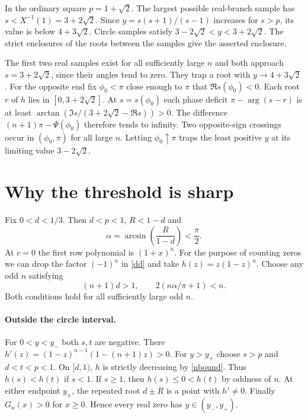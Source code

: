 \documentclass[11pt]{article}
\begin{document}
In the ordinary square $p=1+\sqrt2$. The largest possible real-branch sample has $s<X^{-1}(1)=3+2\sqrt2$. Since $y=s(s+1)/(s-1)$ increases for $s>p$, its value is below $4+3\sqrt2$. Circle samples satisfy $3-2\sqrt2<y<3+2\sqrt2$. The strict enclosures of the roots between the samples give the asserted enclosure.

The first two real samples exist for all sufficiently large $n$ and both approach $s=3+2\sqrt2$, since their angles tend to zero. They trap a root with $y\to4+3\sqrt2$. For the opposite end fix $\phi_0<\pi$ close enough to $\pi$ that $\Re s(\phi_0)<0$. Each root $r$ of $h$ lies in $[0,3+2\sqrt2]$. At $s=s(\phi_0)$ each phase deficit $\pi-\arg(s-r)$ is at least $\arctan(\Im s/(3+2\sqrt2-\Re s))>0$. The difference $(n+1)\pi-\Psi(\phi_0)$ therefore tends to infinity. Two opposite-sign crossings occur in $(\phi_0,\pi)$ for all large $n$. Letting $\phi_0\uparrow\pi$ traps the least positive $y$ at its limiting value $3-2\sqrt2$.

\section{Why the threshold is sharp}
Fix $0<d<1/3$. Then $d<p<1$, $R<1-d$ and
\[
 \alpha=\arcsin\!\left(\frac{R}{1-d}\right)<\frac\pi2.
\]
At $c=0$ the first row polynomial is $(1+x)^n$. For the purpose of counting zeros we can drop the factor $(-1)^n$ in \eqref{dd} and take $h(z)=z(1-z)^n$. Choose any odd $n$ satisfying
\begin{equation}\label{nbound}
 (n+1)d>1,\qquad 2(n\alpha/\pi+1)<n.
\end{equation}
Both conditions hold for all sufficiently large odd $n$.

\paragraph{Outside the circle interval.} For $0<y<y_-$ both $s,t$ are negative. There $h'(z)=(1-z)^{n-1}(1-(n+1)z)>0$. For $y>y_+$ choose $s>p$ and $d<t<p<1$. On $[d,1)$, $h$ is strictly decreasing by \eqref{nbound}. Thus $h(s)<h(t)$ if $s<1$. If $s\ge1$, then $h(s)\le0<h(t)$ by oddness of $n$. At either endpoint $y_\pm$, the repeated root $d\pm R$ is a point with $h'\ne0$. Finally $G_n(x)>0$ for $x\ge0$. Hence every real zero has $y\in(y_-,y_+)$.
\end{document}

